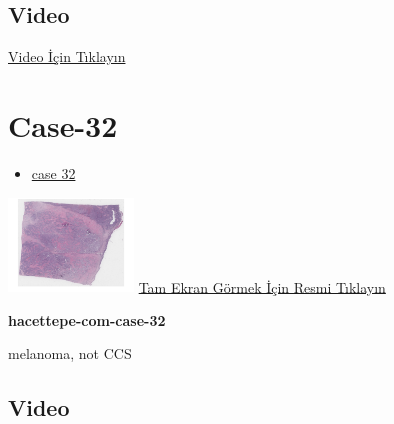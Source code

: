 \documentclass[
  letterpaper,
  DIV=11,
  numbers=noendperiod]{scrreprt}
\providecommand{\tightlist}{%
  \setlength{\itemsep}{0pt}\setlength{\parskip}{0pt}}\usepackage{longtable,booktabs,array}
\begin{document}
\hypertarget{video-29}{%
\subsection{Video}\label{video-29}}

\href{https://www.youtube.com/watch?v=KHM2yQkRIV8}{Video İçin Tıklayın}

\hypertarget{sec-hacettepe-case-of-the-month-case-32}{%
\section{Case-32}\label{sec-hacettepe-case-of-the-month-case-32}}

\begin{itemize}
\tightlist
\item
  \href{https://www.youtube.com/watch?v=mnLIi1sNnlQ\&ab_channel=KemalKosemehmetoglu}{case
  32}
\end{itemize}

\href{https://images.patolojiatlasi.com/hacettepe-com-case-32/HE.html}{\includegraphics[width=0.25\textwidth,height=\textheight]{./screenshots/thumbnail_hacettepe-com-case-32.png}}
\href{https://images.patolojiatlasi.com/hacettepe-com-case-32/HE.html}{Tam
Ekran Görmek İçin Resmi Tıklayın}

\textbf{hacettepe-com-case-32}

\begin{tcolorbox}[enhanced jigsaw, colbacktitle=quarto-callout-tip-color!10!white, colback=white, titlerule=0mm, opacityback=0, colframe=quarto-callout-tip-color-frame, opacitybacktitle=0.6, bottomrule=.15mm, breakable, coltitle=black, title=\textcolor{quarto-callout-tip-color}{\faLightbulb}\hspace{0.5em}{Tanı}, toprule=.15mm, toptitle=1mm, bottomtitle=1mm, arc=.35mm, rightrule=.15mm, leftrule=.75mm, left=2mm]

melanoma, not CCS

\end{tcolorbox}

\hypertarget{video-30}{%
\subsection{Video}\label{video-30}}
\end{document}
